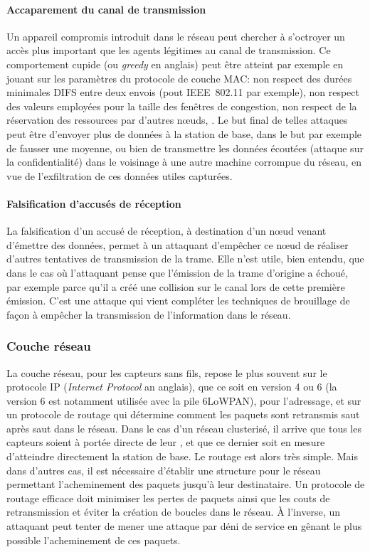         \paragraph{Accaparement du canal de transmission}
Un appareil compromis introduit dans le réseau peut chercher à s'octroyer un accès plus important que les agents légitimes au canal de transmission.
Ce comportement cupide (ou \textit{greedy} en anglais) peut être atteint par exemple en jouant sur les paramètres du protocole de couche MAC: non respect des durées minimales DIFS entre deux envois (pout IEEE~802.11 par exemple), non respect des valeurs employées pour la taille des fenêtres de congestion, non respect de la réservation des ressources par d'autres nœuds, \etc.
Le but final de telles attaques peut être d'envoyer plus de données à la station de base, dans le but par exemple de fausser une moyenne, ou bien de transmettre les données écoutées (attaque sur la confidentialité) dans le voisinage à une autre machine corrompue du réseau, en vue de l'exfiltration de ces données utiles capturées.

        \paragraph{Falsification d'accusés de réception}
La falsification d'un accusé de réception, à destination d'un nœud venant d'émettre des données, permet à un attaquant d'empêcher ce nœud de réaliser d'autres tentatives de transmission de la trame.
Elle n'est utile, bien entendu, que dans le cas où l'attaquant pense que l'émission de la trame d'origine a échoué, par exemple parce qu'il a créé une collision sur le canal lors de cette première émission.
C'est une attaque qui vient compléter les techniques de brouillage de façon à empêcher la transmission de l'information dans le réseau.

    \subsubsection{Couche réseau}
La couche réseau, pour les capteurs sans fils, repose le plus souvent sur le protocole IP (\textit{Internet Protocol} an anglais), que ce soit en version 4 ou 6 (la version 6 est notamment utilisée avec la pile 6LoWPAN), pour l'adressage, et sur un protocole de routage qui détermine comment les paquets sont retransmis saut après saut dans le réseau.
Dans le cas d'un réseau clusterisé, il arrive que tous les capteurs soient à portée directe de leur \ch, et que ce dernier soit en mesure d'atteindre directement la station de base.
Le routage est alors très simple.
Mais dans d'autres cas, il est nécessaire d'établir une structure pour le réseau permettant l'acheminement des paquets jusqu'à leur destinataire.
Un protocole de routage efficace doit minimiser les pertes de paquets ainsi que les couts de retransmission et éviter la création de boucles dans le réseau.
À l'inverse, un attaquant peut tenter de mener une attaque par déni de service en gênant le plus possible l'acheminement de ces paquets.

